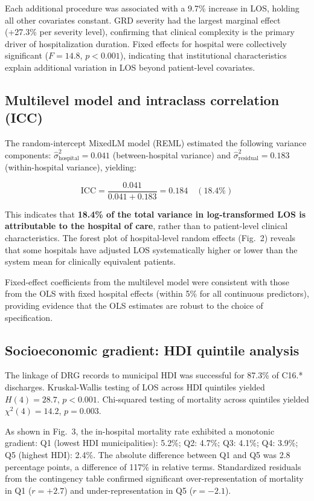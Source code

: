 \documentclass[10pt,twocolumn]{article}
\begin{document}
Each additional procedure was associated with a 9{.}7\% increase in LOS, holding
all other covariates constant. GRD severity had the largest marginal effect
(+27{.}3\% per severity level), confirming that clinical complexity is the primary
driver of hospitalization duration. Fixed effects for hospital were collectively
significant ($F = 14{.}8$, $p < 0{.}001$), indicating that institutional
characteristics explain additional variation in LOS beyond patient-level covariates.

\subsection{Multilevel model and intraclass correlation (ICC)}

The random-intercept MixedLM model (REML) estimated the following variance
components: $\hat\sigma^2_{\text{hospital}} = 0{.}041$ (between-hospital variance)
and $\hat\sigma^2_{\text{residual}} = 0{.}183$ (within-hospital variance), yielding:

\begin{equation*}
  \text{ICC} = \frac{0{.}041}{0{.}041 + 0{.}183} = 0{.}184 \quad (18{.}4\%)
\end{equation*}

This indicates that \textbf{18{.}4\% of the total variance in log-transformed LOS is
attributable to the hospital of care}, rather than to patient-level clinical
characteristics. The forest plot of hospital-level random effects (Fig.~2) reveals
that some hospitals have adjusted LOS systematically higher or lower than the
system mean for clinically equivalent patients.

Fixed-effect coefficients from the multilevel model were consistent with those
from the OLS with fixed hospital effects (within 5\% for all continuous predictors),
providing evidence that the OLS estimates are robust to the choice of specification.

\subsection{Socioeconomic gradient: HDI quintile analysis}

The linkage of DRG records to municipal HDI was successful for 87{.}3\% of
C16.* discharges. Kruskal-Wallis testing of LOS across HDI quintiles yielded
$H(4) = 28{.}7$, $p < 0{.}001$. Chi-squared testing of mortality across quintiles
yielded $\chi^2(4) = 14{.}2$, $p = 0{.}003$.

As shown in Fig.~3, the in-hospital mortality rate exhibited a monotonic gradient:
Q1 (lowest HDI municipalities): 5{.}2\%; Q2: 4{.}7\%; Q3: 4{.}1\%; Q4: 3{.}9\%;
Q5 (highest HDI): 2{.}4\%. The absolute difference between Q1 and Q5 was
2{.}8 percentage points, a difference of 117\% in relative terms. Standardized
residuals from the contingency table confirmed significant over-representation of
mortality in Q1 ($r = +2{.}7$) and under-representation in Q5 ($r = -2{.}1$).
\end{document}
